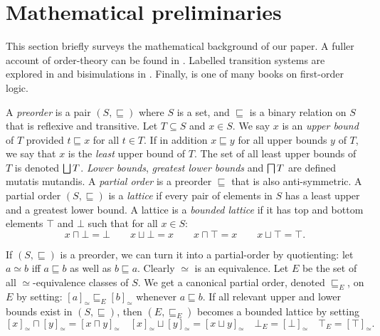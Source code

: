 \section{Mathematical preliminaries}\label{preliminaries}

\NI This section briefly surveys the mathematical background of our
paper.  A fuller account of order-theory can be found in
\cite{DaveyBA:intlatao}.  Labelled transition systems are explored in
\cite{SassoneV:modcontac,HennessyM:Algtheop} and bisimulations in
\cite{SangiorgiD:intbisac}. Finally, \cite{EndertonHB:matinttl} is one
of many books on first-order logic.

A \emph{preorder} is a pair $(S, \sqsubseteq)$ where $S$ is a set, and
$\sqsubseteq$ is a binary relation on $S$ that is reflexive and
transitive. Let $T \subseteq S$ and $x \in S$. We say $x$ is an
\emph{upper bound} of $T$ provided $t \sqsubseteq x$ for all $t \in
T$. If in addition $x \sqsubseteq y$ for all upper bounds $y$ of $T$,
we say that $x$ is the \emph{least} upper bound of $T$.  The set of
all least upper bounds of $T$ is denoted $\bigsqcup T$.  \emph{Lower
  bounds}, \emph{greatest lower bounds} and $\bigsqcap T$ are defined
mutatis mutandis.  A \emph{partial order} is a preorder $\sqsubseteq$
that is also anti-symmetric.  A partial order $(S, \sqsubseteq)$ is a
\emph{lattice} if every pair of elements in $S$ has a least upper and
a greatest lower bound.  A lattice is a \emph{bounded lattice} if it
has top and bottom elements $\top$ and $\bot$ such that for all $x \in
S$:
\[
x \sqcap \bot = \bot \nonumber \qquad
x \sqcup \bot = x \nonumber \qquad
x \sqcap \top = x \nonumber \qquad
x \sqcup \top = \top \nonumber.
\]

\NI If $(S, \sqsubseteq)$ is a preorder, we can turn it into a
partial-order by quotienting: let $a \simeq b$ iff $a \sqsubseteq b$
as well as $b \sqsubseteq a$. Clearly $\simeq$ is an equivalence. Let
$E$ be the set of all $\simeq$-equivalence classes of $S$. We get a
canonical partial order, denoted $\sqsubseteq_E$, on $E$ by setting:
$[a]_{\simeq} \sqsubseteq_E [b]_{\simeq}$ whenever $a \sqsubseteq
b$. If all relevant upper and lower bounds exist in $(S,
\sqsubseteq)$, then $(E, \sqsubseteq_E)$ becomes a bounded lattice by
setting
\[
   [x]_{\simeq} \sqcap [y]_{\simeq} = [ x \sqcap y ]_{\simeq}
       \quad
   [x]_{\simeq} \sqcup [y]_{\simeq} = [ x \sqcup y ]_{\simeq}
       \quad
   \bot_{E} = [\bot]_{\simeq}
       \quad
   \top_{E} = [\top]_{\simeq}.
\]



